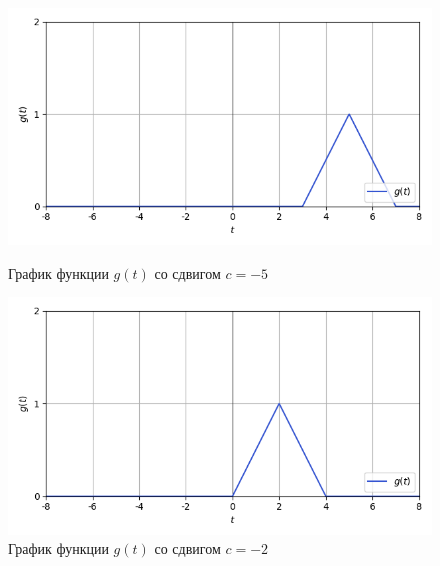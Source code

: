 \documentclass[a4paper]{article}
\begin{document}
\begin{figure}[H]
    \begin{minipage}{0.5\textwidth}
        \centering \includegraphics[width=\textwidth]{sources/6_complex/graph_1.png}
        \caption{График функции $g(t)$ со сдвигом $c = -5$} 
    \end{minipage}\hfill
    \begin{minipage}{0.5\textwidth}
        \centering \includegraphics[width=\textwidth]{sources/6_complex/graph_2.png}
        \caption{График функции $g(t)$ со сдвигом $c = -2$} 
    \end{minipage}
\end{figure}
\end{document}

